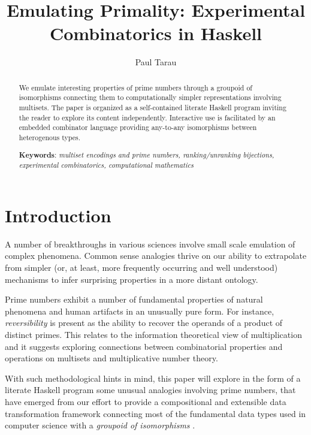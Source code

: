 \documentclass[]{INCLUDES/llncs}
\title{
    Emulating Primality: Experimental Combinatorics in Haskell
 }
\author{Paul Tarau}
\institute{
   Department of Computer Science and Engineering\\
   University of North Texas\\
   {\em E-mail: tarau@cs.unt.edu}
}
\begin{document}
\maketitle
\date{}

\begin{abstract}
We emulate interesting properties of prime numbers
through a groupoid of isomorphisms connecting them to
computationally simpler representations involving multisets.
The paper is
organized as a self-contained literate Haskell program inviting the reader to
explore its content independently. Interactive use is 
facilitated by an embedded combinator language
providing any-to-any isomorphisms between heterogenous
types.

{\bf Keywords}:
{\em 
multiset encodings and prime numbers,
ranking/unranking bijections,
experimental combinatorics,
computational mathematics
}
\end{abstract}

\begin{comment}
\begin{code}
module ISOPRIMES where
import Data.List
import Data.Graph
import Data.Graph.Inductive
import Graphics.Gnuplot.Simple
import ISO0
\end{code}
\end{comment}

\section{Introduction}

A number of breakthroughs in various sciences involve small scale emulation of
complex phenomena. Common sense analogies thrive on our ability to extrapolate
from simpler (or, at least, more frequently occurring and well understood)
mechanisms to infer surprising properties in a more distant ontology.

Prime numbers exhibit a number of fundamental properties of natural phenomena
and human artifacts in an unusually pure form. For instance, {\em
reversibility} is present as the ability to recover the operands of a
product of distinct primes. This relates to the information
theoretical view of multiplication \cite{DBLP:journals/tit/Pippenger05} and it
suggests exploring connections between 
 combinatorial properties and
operations on multisets and multiplicative
number theory.

With such methodological hints in mind, this paper will explore in the form of
a literate Haskell program some unusual analogies involving prime numbers, that
have emerged from our effort to provide a compositional and extensible data transformation
framework connecting most of the fundamental data types used in computer
science with a {\em groupoid of isomorphisms} \cite{arxiv:fISO}.
\end{document}
